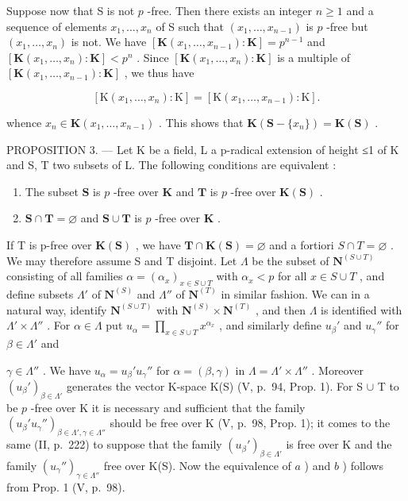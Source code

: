 Suppose now that S is not \(p\) -free. Then there exists an integer \(n \geqslant 1\) and a sequence of elements \(x_1, \ldots, x_n\) of S such that \((x_1, \ldots, x_{n-1})\) is \(p\) -free but \((x_1, \ldots, x_n)\) is not. We have \([\mathbf{K}(x_1, \ldots, x_{n-1}) : \mathbf{K}] = p^{n-1}\) and \([\mathbf{K}(x_1, \ldots, x_n) : \mathbf{K}] < p^n\) . Since \([\mathbf{K}(x_1, \ldots, x_n) : \mathbf{K}]\) is a multiple of \([\mathbf{K}(x_1, \ldots, x_{n-1}) : \mathbf{K}]\) , we thus have

\[
[ \mathrm{K} (x _ {1}, \dots , x _ {n}): \mathrm{K} ] = [ \mathrm{K} (x _ {1}, \dots , x _ {n - 1}): \mathrm{K} ].
\]

whence \(x_{n} \in \mathbf{K}(x_{1}, \ldots, x_{n-1})\) . This shows that \(\mathbf{K}(\mathbf{S} - \{x_{n}\}) = \mathbf{K}(\mathbf{S})\) .

PROPOSITION 3. --- Let K be a field, L a p-radical extension of height ≤1 of K and S, T two subsets of L. The following conditions are equivalent :

\begin{enumerate}
\def\labelenumi{\alph{enumi})}
\item
  The subset \(\mathbf{S}\) is \(p\) -free over \(\mathbf{K}\) and \(\mathbf{T}\) is \(p\) -free over \(\mathbf{K}(\mathbf{S})\) .
\item
  \(\mathbf{S} \cap \mathbf{T} = \varnothing\) and \(\mathbf{S} \cup \mathbf{T}\) is \(p\) -free over \(\mathbf{K}\) .
\end{enumerate}

If T is p-free over \(\mathbf{K}(\mathbf{S})\) , we have \(\mathbf{T} \cap \mathbf{K}(\mathbf{S}) = \varnothing\) and a fortiori \(S \cap T = \varnothing\) . We may therefore assume S and T disjoint. Let \(\Lambda\) be the subset of \(\mathbf{N}^{(S \cup T)}\) consisting of all families \(\alpha = (\alpha_x)_{x \in S \cup T}\) with \(\alpha_x < p\) for all \(x \in S \cup T\) , and define subsets \(\Lambda'\) of \(\mathbf{N}^{(S)}\) and \(\Lambda''\) of \(\mathbf{N}^{(T)}\) in similar fashion. We can in a natural way, identify \(\mathbf{N}^{(S \cup T)}\) with \(\mathbf{N}^{(S)} \times \mathbf{N}^{(T)}\) , and then \(\Lambda\) is identified with \(\Lambda' \times \Lambda''\) . For \(\alpha \in \Lambda\) put \(u_\alpha = \prod_{x \in S \cup T} x^{\alpha_x}\) , and similarly define \(u_\beta'\) and \(u_\gamma''\) for \(\beta \in \Lambda'\) and

\(\gamma \in \Lambda''\) . We have \(u_{\alpha} = u_{\beta}' u_{\gamma}''\) for \(\alpha = (\beta, \gamma)\) in \(\Lambda = \Lambda' \times \Lambda''\) . Moreover \((u_{\beta}')_{\beta \in \Lambda'}\) generates the vector K-space K(S) (V, p.~94, Prop. 1). For S \(\cup\) T to be \(p\) -free over K it is necessary and sufficient that the family \((u_{\beta}' u_{\gamma}'')_{\beta \in \Lambda', \gamma \in \Lambda''}\) should be free over K (V, p.~98, Prop. 1); it comes to the same (II, p.~222) to suppose that the family \((u_{\beta}')_{\beta \in \Lambda'}\) is free over K and the family \((u_{\gamma}'')_{\gamma \in \Lambda''}\) free over K(S). Now the equivalence of \(a\) ) and \(b\) ) follows from Prop. 1 (V, p.~98).

